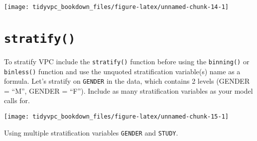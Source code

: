 \documentclass[
]{book}
\newenvironment{Shaded}{\begin{snugshade}}{\end{snugshade}}
\newcommand{\DataTypeTok}[1]{\textcolor[rgb]{0.13,0.29,0.53}{#1}}
\newcommand{\DecValTok}[1]{\textcolor[rgb]{0.00,0.00,0.81}{#1}}
\newcommand{\KeywordTok}[1]{\textcolor[rgb]{0.13,0.29,0.53}{\textbf{#1}}}
\newcommand{\NormalTok}[1]{#1}
\newcommand{\OperatorTok}[1]{\textcolor[rgb]{0.81,0.36,0.00}{\textbf{#1}}}
\newcommand{\StringTok}[1]{\textcolor[rgb]{0.31,0.60,0.02}{#1}}
\begin{document}
\texttt{[image: tidyvpc\_bookdown\_files/figure-latex/unnamed-chunk-14-1]}

\hypertarget{stratify}{%
\section{\texorpdfstring{\texttt{stratify()}}{stratify()}}\label{stratify}}

To stratify VPC include the \texttt{stratify()} function before using the \texttt{binning()} or \texttt{binless()} function and use the unquoted stratification variable(s) name as a formula. Let's stratify on \texttt{GENDER} in the data, which contains 2 levels (GENDER = ``M'', GENDER = ``F''). Include as many stratification variables as your model calls for.

\begin{Shaded}
\end{Shaded}

\texttt{[image: tidyvpc\_bookdown\_files/figure-latex/unnamed-chunk-15-1]}

Using multiple stratification variables \texttt{GENDER} and \texttt{STUDY}.

\begin{Shaded}
\end{Shaded}
\end{document}
